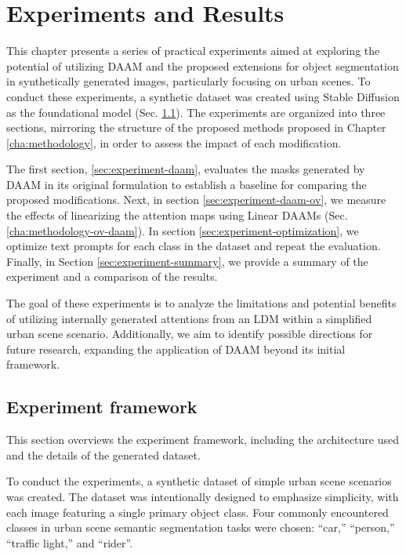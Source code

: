 \chapter{Experiments and Results}
\label{cha:experiments}

This chapter presents a series of practical experiments aimed at exploring the potential of utilizing DAAM and the proposed extensions for object segmentation in synthetically generated images, particularly focusing on urban scenes. To conduct these experiments, a synthetic dataset was created using Stable Diffusion as the foundational model (Sec. \ref{sec:experiment-framework}). The experiments are organized into three sections, mirroring the structure of the proposed methods proposed in Chapter \ref{cha:methodology}, in order to assess the impact of each modification.

The first section, \ref{sec:experiment-daam}, evaluates the masks generated by DAAM in its original formulation \cite{DAAM} to establish a baseline for comparing the proposed modifications. Next, in section \ref{sec:experiment-daam-ov}, we measure the effects of linearizing the attention maps using Linear DAAMs (Sec. \ref{cha:methodology-ov-daam}). In section \ref{sec:experiment-optimization}, we optimize text prompts for each class in the dataset and repeat the evaluation. Finally, in Section \ref{sec:experiment-summary}, we provide a summary of the experiment and a comparison of the results.

The goal of these experiments is to analyze the limitations and potential benefits of utilizing internally generated attentions from an LDM within a simplified urban scene scenario. Additionally, we aim to identify possible directions for future research, expanding the application of DAAM beyond its initial framework.

\section{Experiment framework}
\label{sec:experiment-framework}

This section overviews the experiment framework, including the architecture used and the details of the generated dataset.

To conduct the experiments, a synthetic dataset of simple urban scene scenarios was created. The dataset was intentionally designed to emphasize simplicity, with each image featuring a single primary object class. Four commonly encountered classes \cite{Cityscapes} in urban scene semantic segmentation tasks were chosen: ``car,'' ``person,'' ``traffic light,'' and ``rider''.

